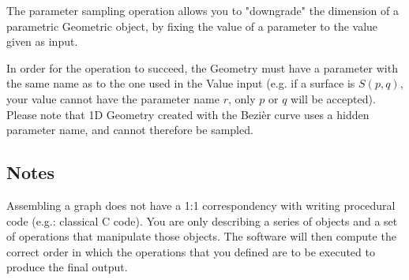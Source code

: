 The parameter sampling operation allows you to "downgrade" the dimension of a parametric
Geometric object, by fixing the value of a parameter to the value given as input.

In order for the operation to succeed, the Geometry must have a parameter with the same name
as to the one used in the Value input (e.g. if a surface is $S(p, q)$, your value cannot
have the parameter name $r$, only $p$ or $q$ will be accepted). Please note that 1D Geometry created with the Bezi\`er
curve uses a hidden parameter name, and cannot therefore be sampled.

\subsection{Notes}
Assembling a graph does not have a 1:1 correspondency with writing procedural
code (e.g.: classical C code). You are only describing a series of
objects and a set of operations that manipulate those objects. The software
will then compute the correct order in which the operations that you defined
are to be executed to produce the final output.

